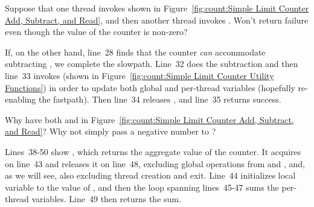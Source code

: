 \QuickQuiz{}
	Suppose that one thread invokes  shown in
	Figure~\ref{fig:count:Simple Limit Counter Add, Subtract, and Read},
	and then another thread invokes .
	Won't  return failure even though the value of
	the counter is non-zero?
 \QuickQuizEnd

If, on the other hand, line~28 finds that the counter \emph{can}
accommodate subtracting , we complete the slowpath.
Line~32 does the subtraction and then
line~33 invokes  (shown in
Figure~\ref{fig:count:Simple Limit Counter Utility Functions})
in order to update both global and per-thread variables
(hopefully re-enabling the fastpath).
Then line~34 releases , and line~35 returns success.

\QuickQuiz{}
	Why have both  and  in
	Figure~\ref{fig:count:Simple Limit Counter Add, Subtract, and Read}?
	Why not simply pass a negative number to ?
 \QuickQuizEnd

Lines~38-50 show , which returns the aggregate value
of the counter.
It acquires  on line~43 and releases it on line~48,
excluding global operations from  and ,
and, as we will see, also excluding thread creation and exit.
Line~44 initializes local variable  to the value of
, and then the loop spanning lines~45-47 sums the
per-thread  variables.
Line~49 then returns the sum.


